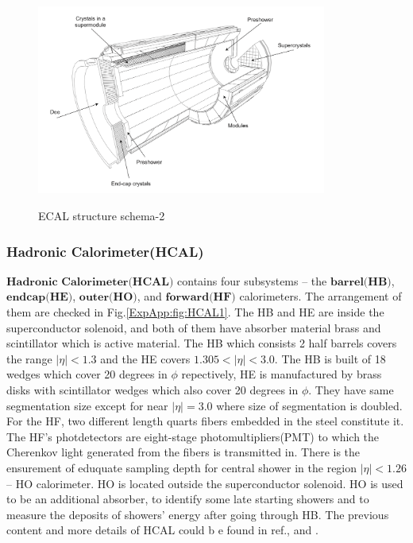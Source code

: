 			\begin{figure}[H]
			\centering{}
		    	\includegraphics[width=0.85\textwidth]{Figures/ExpApparatus/ECAL2.png}\\
			\caption{ECAL structure schema-2\cite{ECAL_ex}}
			\label{ExpApp:fig:ECAL2}
			\end{figure}
			\FloatBarrier

		\subsubsection{Hadronic Calorimeter(HCAL)}
		\label{sssec:hcal}

			$\textbf{Hadronic Calorimeter(HCAL)}$ contains four subsystems -- the $\textbf{barrel(HB)}$, $\textbf{endcap(HE)}$, $\textbf{outer(HO)}$, and $\textbf{forward(HF)}$ calorimeters. The arrangement of them are checked in Fig.\ref{ExpApp:fig:HCAL1}. The HB and HE are inside the superconductor solenoid, and both of them have absorber material brass and scintillator which is active material. The HB which consists 2 half barrels covers the range $|\eta| < 1.3$ and the HE covers $1.305 < |\eta| < 3.0$. The HB is built of 18 wedges which cover 20 degrees in $\phi$ repectively, HE is manufactured by brass disks with scintillator wedges which also cover 20 degrees in $\phi$. They have same segmentation size except for near $|\eta| = 3.0$ where size of segmentation is doubled. For the HF, two different length quarts fibers embedded in the steel constitute it. The HF's photdetectors are eight-stage photomultipliers(PMT) to which the Cherenkov light generated from the fibers is transmitted in. There is the ensurement of eduquate sampling depth for central shower in the region $|\eta| < 1.26$ -- HO calorimeter. HO is located outside the superconductor solenoid. HO is used to be an additional absorber, to identify some late starting showers and to measure the deposits of showers' energy after going through HB. The previous content and more details of HCAL could b e found in ref.\cite{Chatrchyan:2008aa},\cite{Canko_ak_2009} and \cite{collaboration_2012}.

